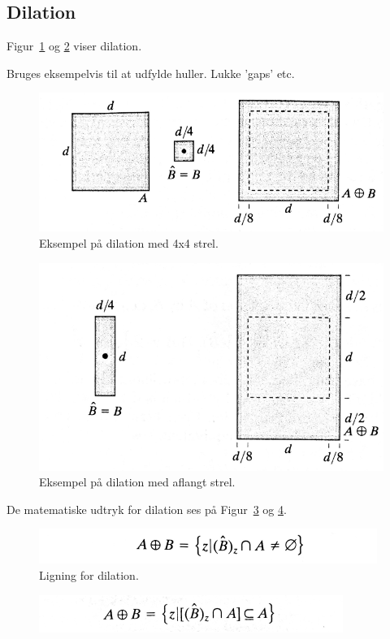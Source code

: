 \subsection{Dilation}
Figur~\ref{fig:dilation1} og \ref{fig:dilation2} viser dilation. 

Bruges eksempelvis til at udfylde huller. Lukke 'gaps' etc.

\begin{figure}[H]
	\centering
	\includegraphics[width=0.7\linewidth]{figs/spm09/dilation1}
	\caption{Eksempel på dilation med 4x4 strel.}
	\label{fig:dilation1}
\end{figure}

\begin{figure}[H]
	\centering
	\includegraphics[width=0.7\linewidth]{figs/spm09/dilation2}
	\caption{Eksempel på dilation med aflangt strel.}
	\label{fig:dilation2}
\end{figure}

De matematiske udtryk for dilation ses på Figur~\ref{fig:dilationeq1} og \ref{fig:dilationeq2}.

\begin{figure}[H]
	\centering
	\includegraphics[width=0.7\linewidth]{figs/spm09/dilationeq1}
	\caption{Ligning for dilation.}
	\label{fig:dilationeq1}
\end{figure}

\begin{figure}[H]
	\centering
	\includegraphics[width=0.6\linewidth]{figs/spm09/dilationeq2}
	\caption{}
	\label{fig:dilationeq2}
\end{figure}
